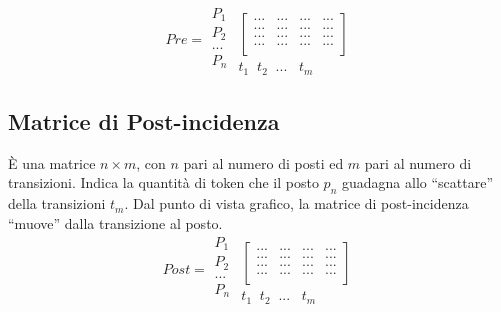 \documentclass[a4paper]{report}
\begin{document}
\[
Pre =
\begin{array}{c}
  P_1\\
  P_2\\
  ...\\
  P_n\\
  
\end{array}
\begin{array}{cc}
  \\
 \begin{bmatrix}
   ... & ... & ... & ... \\
   ... & ... & ... & ... \\
   ... & ... & ... & ... \\
   ... & ... & ... & ... \\
 \end{bmatrix}\\
  t_1\;\;t_2\;\;...\;\;\;t_m
\end{array}
\]

\subsection{Matrice di Post-incidenza}
\`E una matrice $n \times m$, con $n$ pari al numero di posti ed $m$
pari al numero di transizioni. Indica la quantit\`a di token che il
posto $p_n$ guadagna allo ``scattare'' della transizioni $t_m$. Dal
punto di vista grafico, la matrice di post-incidenza ``muove'' dalla
transizione al posto. 
\[
Post =
\begin{array}{c}
  P_1\\
  P_2\\
  ...\\
  P_n\\
  
\end{array}
\begin{array}{cc}
  \\
 \begin{bmatrix}
   ... & ... & ... & ... \\
   ... & ... & ... & ... \\
   ... & ... & ... & ... \\
   ... & ... & ... & ... \\
 \end{bmatrix}\\
  t_1\;\;t_2\;\;...\;\;\;t_m
\end{array}
\]
\end{document}
